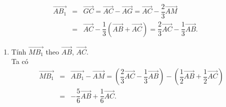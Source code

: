 \begin{vd}
{{
		}
		\allowdisplaybreaks
		\begin{eqnarray*}
			\overrightarrow{AB_1}&= & \overrightarrow{GC} = \overrightarrow{AC} - \overrightarrow{AG} = \overrightarrow{AC} - \dfrac{2}{3}\overrightarrow{AM}\\
			&= & \overrightarrow{AC} - \dfrac{1}{3}\left(\overrightarrow{AB} + \overrightarrow{AC}\right) = \dfrac{2}{3}\overrightarrow{AC} - \dfrac{1}{3}\overrightarrow{AB}.
		\end{eqnarray*}
		\begin{enumerate}
			\item[b)] Tính $\overrightarrow{MB_1}$ theo $\overrightarrow{AB}$, $\overrightarrow{AC}$.\\
			      Ta có
			      \allowdisplaybreaks
			      \begin{eqnarray*}
				      \overrightarrow{MB_1}&= & \overrightarrow{AB_1} - \overrightarrow{AM} = \left(\dfrac{2}{3}\overrightarrow{AC} - \dfrac{1}{3}\overrightarrow{AB}\right) - \left(\dfrac{1}{2}\overrightarrow{AB} + \dfrac{1}{2}\overrightarrow{AC}\right)\\
				      &= & -\dfrac{5}{6}\overrightarrow{AB} + \dfrac{1}{6}\overrightarrow{AC}.
			      \end{eqnarray*}
		\end{enumerate}
	}
\end{vd}

